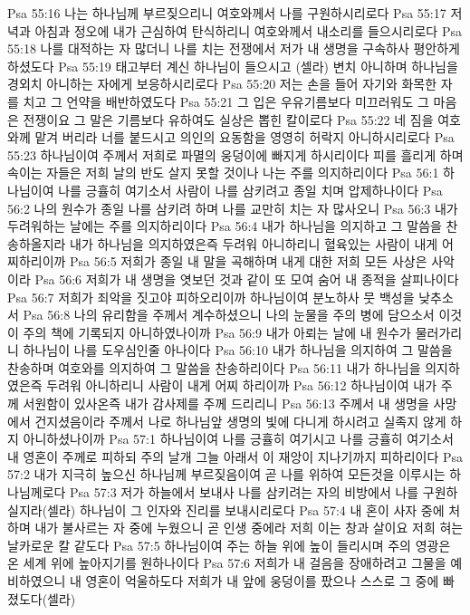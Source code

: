 Psa 55:16  나는 하나님께 부르짖으리니 여호와께서 나를 구원하시리로다
Psa 55:17  저녁과 아침과 정오에 내가 근심하여 탄식하리니 여호와께서 내소리를 들으시리로다
Psa 55:18  나를 대적하는 자 많더니 나를 치는 전쟁에서 저가 내 생명을 구속하사 평안하게 하셨도다
Psa 55:19  태고부터 계신 하나님이 들으시고 (셀라) 변치 아니하며 하나님을 경외치 아니하는 자에게 보응하시리로다
Psa 55:20  저는 손을 들어 자기와 화목한 자를 치고 그 언약을 배반하였도다
Psa 55:21  그 입은 우유기름보다 미끄러워도 그 마음은 전쟁이요 그 말은 기름보다 유하여도 실상은 뽑힌 칼이로다
Psa 55:22  네 짐을 여호와께 맡겨 버리라 너를 붙드시고 의인의 요동함을 영영히 허락지 아니하시리로다
Psa 55:23  하나님이여 주께서 저희로 파멸의 웅덩이에 빠지게 하시리이다 피를 흘리게 하며 속이는 자들은 저희 날의 반도 살지 못할 것이나 나는 주를 의지하리이다
Psa 56:1  하나님이여 나를 긍휼히 여기소서 사람이 나를 삼키려고 종일 치며 압제하나이다
Psa 56:2  나의 원수가 종일 나를 삼키려 하며 나를 교만히 치는 자 많사오니
Psa 56:3  내가 두려워하는 날에는 주를 의지하리이다
Psa 56:4  내가 하나님을 의지하고 그 말씀을 찬송하올지라 내가 하나님을 의지하였은즉 두려워 아니하리니 혈육있는 사람이 내게 어찌하리이까
Psa 56:5  저희가 종일 내 말을 곡해하며 내게 대한 저희 모든 사상은 사악이라
Psa 56:6  저희가 내 생명을 엿보던 것과 같이 또 모여 숨어 내 종적을 살피나이다
Psa 56:7  저희가 죄악을 짓고야 피하오리이까 하나님이여 분노하사 뭇 백성을 낮추소서
Psa 56:8  나의 유리함을 주께서 계수하셨으니 나의 눈물을 주의 병에 담으소서 이것이 주의 책에 기록되지 아니하였나이까
Psa 56:9  내가 아뢰는 날에 내 원수가 물러가리니 하나님이 나를 도우심인줄 아나이다
Psa 56:10  내가 하나님을 의지하여 그 말씀을 찬송하며 여호와를 의지하여 그 말씀을 찬송하리이다
Psa 56:11  내가 하나님을 의지하였은즉 두려워 아니하리니 사람이 내게 어찌 하리이까
Psa 56:12  하나님이여 내가 주께 서원함이 있사온즉 내가 감사제를 주께 드리리니
Psa 56:13  주께서 내 생명을 사망에서 건지셨음이라 주께서 나로 하나님앞 생명의 빛에 다니게 하시려고 실족지 않게 하지 아니하셨나이까
Psa 57:1  하나님이여 나를 긍휼히 여기시고 나를 긍휼히 여기소서 내 영혼이 주께로 피하되 주의 날개 그늘 아래서 이 재앙이 지나기까지 피하리이다
Psa 57:2  내가 지극히 높으신 하나님께 부르짖음이여 곧 나를 위하여 모든것을 이루시는 하나님께로다
Psa 57:3  저가 하늘에서 보내사 나를 삼키려는 자의 비방에서 나를 구원하실지라(셀라) 하나님이 그 인자와 진리를 보내시리로다
Psa 57:4  내 혼이 사자 중에 처하며 내가 불사르는 자 중에 누웠으니 곧 인생 중에라 저희 이는 창과 살이요 저희 혀는 날카로운 칼 같도다
Psa 57:5  하나님이여 주는 하늘 위에 높이 들리시며 주의 영광은 온 세계 위에 높아지기를 원하나이다
Psa 57:6  저희가 내 걸음을 장애하려고 그물을 예비하였으니 내 영혼이 억울하도다 저희가 내 앞에 웅덩이를 팠으나 스스로 그 중에 빠졌도다(셀라)
